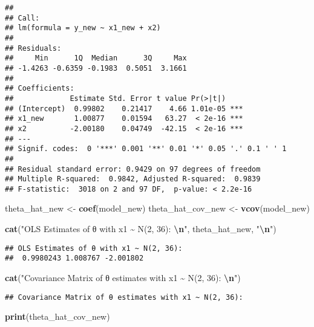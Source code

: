 \documentclass[
]{article}
\newenvironment{Shaded}{\begin{snugshade}}{\end{snugshade}}
\newcommand{\FunctionTok}[1]{\textcolor[rgb]{0.13,0.29,0.53}{\textbf{#1}}}
\newcommand{\NormalTok}[1]{#1}
\newcommand{\OtherTok}[1]{\textcolor[rgb]{0.56,0.35,0.01}{#1}}
\newcommand{\SpecialCharTok}[1]{\textcolor[rgb]{0.81,0.36,0.00}{\textbf{#1}}}
\newcommand{\StringTok}[1]{\textcolor[rgb]{0.31,0.60,0.02}{#1}}
\begin{document}
\begin{verbatim}
## 
## Call:
## lm(formula = y_new ~ x1_new + x2)
## 
## Residuals:
##     Min      1Q  Median      3Q     Max 
## -1.4263 -0.6359 -0.1983  0.5051  3.1661 
## 
## Coefficients:
##             Estimate Std. Error t value Pr(>|t|)    
## (Intercept)  0.99802    0.21417    4.66 1.01e-05 ***
## x1_new       1.00877    0.01594   63.27  < 2e-16 ***
## x2          -2.00180    0.04749  -42.15  < 2e-16 ***
## ---
## Signif. codes:  0 '***' 0.001 '**' 0.01 '*' 0.05 '.' 0.1 ' ' 1
## 
## Residual standard error: 0.9429 on 97 degrees of freedom
## Multiple R-squared:  0.9842, Adjusted R-squared:  0.9839 
## F-statistic:  3018 on 2 and 97 DF,  p-value: < 2.2e-16
\end{verbatim}

\begin{Shaded}
\begin{Highlighting}[]
\NormalTok{theta\_hat\_new }\OtherTok{\textless{}{-}} \FunctionTok{coef}\NormalTok{(model\_new)}
\NormalTok{theta\_hat\_cov\_new }\OtherTok{\textless{}{-}} \FunctionTok{vcov}\NormalTok{(model\_new)}

\FunctionTok{cat}\NormalTok{(}\StringTok{"OLS Estimates of θ with x1 \textasciitilde{} N(2, 36): }\SpecialCharTok{\textbackslash{}n}\StringTok{"}\NormalTok{, theta\_hat\_new, }\StringTok{"}\SpecialCharTok{\textbackslash{}n}\StringTok{"}\NormalTok{)}
\end{Highlighting}
\end{Shaded}

\begin{verbatim}
## OLS Estimates of θ with x1 ~ N(2, 36): 
##  0.9980243 1.008767 -2.001802
\end{verbatim}

\begin{Shaded}
\begin{Highlighting}[]
\FunctionTok{cat}\NormalTok{(}\StringTok{"Covariance Matrix of θ estimates with x1 \textasciitilde{} N(2, 36): }\SpecialCharTok{\textbackslash{}n}\StringTok{"}\NormalTok{)}
\end{Highlighting}
\end{Shaded}

\begin{verbatim}
## Covariance Matrix of θ estimates with x1 ~ N(2, 36):
\end{verbatim}

\begin{Shaded}
\begin{Highlighting}[]
\FunctionTok{print}\NormalTok{(theta\_hat\_cov\_new)}
\end{Highlighting}
\end{Shaded}
\end{document}
